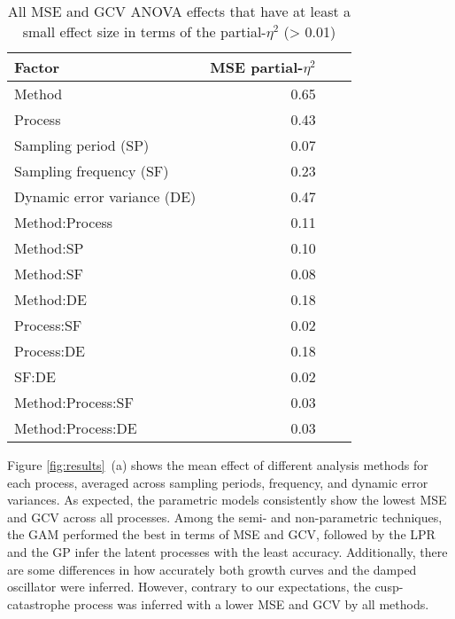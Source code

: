 \documentclass[man, floatsintext]{apa7}
\begin{document}
\begin{table}[htbp]
  \vspace*{2em}
  \begin{threeparttable}
    \caption{All MSE and GCV ANOVA effects that have at least a small effect
      size in terms of the partial-$\eta^2$ (> 0.01)}
    \label{tab:peta}
    \begin{tabular}{@{}lrrr@{}} \toprule
      Factor                      & MSE partial-$\eta^2$ \\ \midrule
      Method                      & 0.65                 \\
      Process                     & 0.43                 \\
      Sampling period (SP)        & 0.07                 \\
      Sampling frequency (SF)     & 0.23                 \\
      Dynamic error variance (DE) & 0.47                 \\
      Method:Process              & 0.11                 \\
      Method:SP                   & 0.10                 \\
      Method:SF                   & 0.08                 \\
      Method:DE                   & 0.18                 \\
      Process:SF                  & 0.02                 \\
      Process:DE                  & 0.18                 \\
      SF:DE                       & 0.02                 \\
      Method:Process:SF           & 0.03                 \\
      Method:Process:DE           & 0.03                 \\ \midrule
    \end{tabular}
  \end{threeparttable}
\end{table}

Figure \ref{fig:results}~(a) shows the mean effect of different analysis
methods
for each process, averaged across sampling periods, frequency, and dynamic
error variances. As expected, the parametric models consistently show the
lowest MSE and GCV across
all processes. Among the semi- and non-parametric techniques, the GAM performed
the best in terms of MSE and GCV, followed by the LPR and the GP
infer the latent processes
with the least accuracy. Additionally, there are some differences in how
accurately both growth curves and the damped oscillator were inferred.
However, contrary
to our expectations, the cusp-catastrophe process was inferred with a lower MSE
and GCV by all methods.
\end{document}
